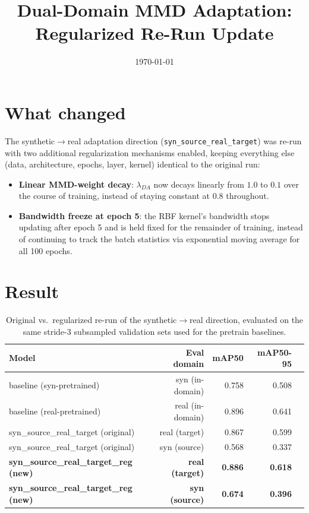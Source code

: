 \documentclass[11pt]{article}
\title{Dual-Domain MMD Adaptation: Regularized Re-Run Update}
\author{}
\date{\today}
\begin{document}
\maketitle

\section{What changed}

The synthetic$\to$real adaptation direction (\texttt{syn\_source\_real\_target}) was re-run with
two additional regularization mechanisms enabled, keeping everything else (data, architecture,
epochs, layer, kernel) identical to the original run:

\begin{itemize}
    \item \textbf{Linear MMD-weight decay}: $\lambda_{DA}$ now decays linearly from $1.0$ to
    $0.1$ over the course of training, instead of staying constant at $0.8$ throughout.
    \item \textbf{Bandwidth freeze at epoch 5}: the RBF kernel's bandwidth stops updating after
    epoch 5 and is held fixed for the remainder of training, instead of continuing to track the
    batch statistics via exponential moving average for all 100 epochs.
\end{itemize}

\section{Result}

\begin{table}[h!]
    \centering
    \begin{tabular}{lrrrr}
        \toprule
        Model & Eval domain & mAP50 & mAP50-95 \\
        \midrule
        baseline (syn-pretrained) & syn (in-domain) & 0.758 & 0.508 \\
        baseline (real-pretrained) & real (in-domain) & 0.896 & 0.641 \\
        \midrule
        syn\_source\_real\_target (original) & real (target) & 0.867 & 0.599 \\
        syn\_source\_real\_target (original) & syn (source) & 0.568 & 0.337 \\
        \midrule
        \textbf{syn\_source\_real\_target\_reg (new)} & \textbf{real (target)} & \textbf{0.886} & \textbf{0.618} \\
        \textbf{syn\_source\_real\_target\_reg (new)} & \textbf{syn (source)} & \textbf{0.674} & \textbf{0.396} \\
        \bottomrule
    \end{tabular}
    \caption{Original vs.\ regularized re-run of the synthetic$\to$real direction, evaluated on
    the same stride-3 subsampled validation sets used for the pretrain baselines.}
\end{table}
\end{document}
